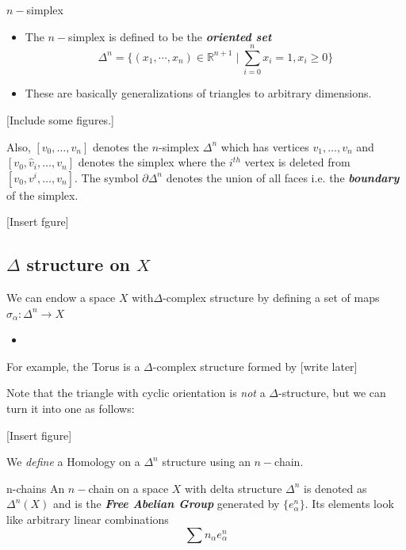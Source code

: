 \documentclass{article}
\newcommand{\R}{\mathbb{R}}
\begin{document}
\begin{mathdefinitionbox}{$n-$simplex}
\begin{itemize}
  \item   The $n-$simplex is defined to be the \emph{\textbf{oriented set}} 
  \[ \Delta^n = \{ \left(x_1, \cdots, x_n\right) \in \R^{n+1} \;|\; \sum_{i = 0}^{n} x_i = 1, x_i \geq 0 \} \] 

  \item These are basically generalizations of triangles to arbitrary dimensions.
\end{itemize}
\end{mathdefinitionbox}

[Include some figures.]

\vskip 0.5cm
Also, $[v_0, \dots, v_n]$ denotes the $n$-simplex $\Delta^n$ which has vertices $v_1, \dots, v_n$ and $[v_0, \hat{v}_i,\dots, v_n]$ denotes the simplex where the $i^{th}$ vertex is deleted from $[v_0, v^i, \dots, v_n]$. The symbol $\partial \Delta^n$ denotes the union of all faces i.e. the \emph{\textbf{boundary}} of the simplex.

\vskip 0.5cm
[Insert fgure]

\vskip 0.5cm
\subsection*{$\Delta$ structure on $X$}

\vskip 0.5cm
\begin{mathdefinitionbox}{}
  We can endow a space $X$ with$\Delta$-complex structure by defining a set of maps $\sigma_{\alpha} : \Delta^n \rightarrow X$ 
  \begin{itemize}
    \item 
  \end{itemize}
\end{mathdefinitionbox}

\vskip 0.5cm
For example, the Torus is a $\Delta$-complex structure formed by [write later]

\vskip 0.5cm
Note that the triangle with cyclic orientation is \emph{not} a $\Delta$-structure, but we can turn it into one as follows:

\vskip 0.5cm
[Insert figure]

\vskip 0.5cm
We \emph{define} a Homology on a $\Delta^n$ structure using an $n-$chain.

\begin{mathdefinitionbox}{n-chains}
  An $n-$chain on a space $X$ with delta structure $\Delta^n$ is denoted as $\Delta^n(X)$ and is the \emph{\textbf{Free Abelian Group}} generated by $\{e^n_{\alpha}\}$. Its elements look like arbitrary linear combinations
  \[ \sum n_{\alpha} e^n_{\alpha} \]
\end{mathdefinitionbox}
\end{document}
